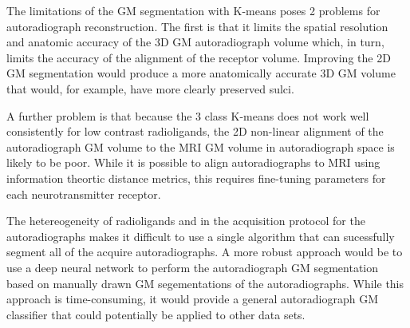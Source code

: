 \documentclass[12pt]{article}
\begin{document}
The limitations of the GM segmentation with K-means poses 2 problems for autoradiograph reconstruction. The first is that it limits the spatial resolution and anatomic accuracy of the 3D GM autoradiograph volume which, in turn, limits the accuracy of the alignment of the receptor volume. Improving the 2D GM segmentation would produce a more anatomically accurate 3D GM volume that would, for example, have more clearly preserved sulci. 

A further problem is that because the 3 class K-means does not work well consistently for low contrast radioligands, the 2D non-linear alignment of the autoradiograph GM volume to the MRI GM volume in autoradiograph space is likely to be poor. While it is possible to align autoradiographs to MRI using information theortic distance metrics, this requires fine-tuning parameters for each neurotransmitter receptor. 

The hetereogeneity of radioligands and in the acquisition protocol for the autoradiographs makes it difficult to use a single algorithm that can sucessfully segment all of the acquire autoradiographs. A more robust approach would be to use a deep neural network to perform the autoradiograph GM segmentation based on manually drawn GM segementations of the autoradiographs. While this approach is time-consuming, it would provide a general autoradiograph GM classifier that could potentially be applied to other data sets. 






\end{document}
